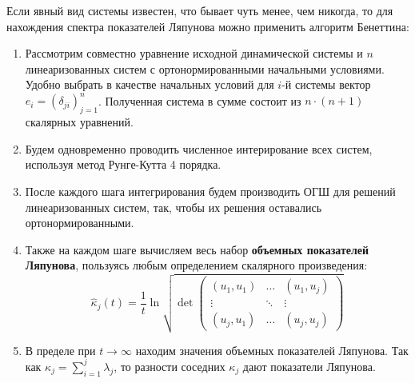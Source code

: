 Если явный вид системы известен, что бывает чуть менее, чем никогда, то для нахождения спектра показателей Ляпунова можно применить алгоритм Бенеттина:
\begin{enumerate}
\item
    Рассмотрим совместно уравнение исходной динамической системы и $n$ линеаризованных систем с ортонормированными начальными условиями.
    Удобно выбрать в качестве начальных условий для $i$-й системы вектор $e_i = \left( \delta_{ji} \right)_{j=1}^{n}$.
    Полученная система в сумме состоит из $n\cdot\left( n+1 \right)$ скалярных уравнений.
\item
    Будем одновременно проводить численное интерирование всех систем, используя метод Рунге-Кутта 4 порядка.
\item
    После каждого шага интегрирования будем производить ОГШ для решений линеаризованных систем, так, чтобы их решения оставались ортонормированными.
\item
    Также на каждом шаге вычисляем весь набор \textbf{объемных показателей Ляпунова}, пользуясь любым определением скалярного произведения:
    \begin{equation*}
        \hat{\kappa}_j(t) = \frac{1}{t} \ln \sqrt{\det \begin{pmatrix}
            \left( u_1, u_1 \right) & \dots & \left( u_1, u_j \right)\\
            \vdots & \ddots & \vdots\\
            \left( u_j, u_1 \right) & \dots & \left( u_j, u_j \right)
        \end{pmatrix} }
    \end{equation*}
\item
    В пределе при $t \to \infty$ находим значения объемных показателей Ляпунова. Так как $\kappa_j = \sum_{i=1}^{j} \lambda_j$, то разности соседних $\kappa_j$ дают показатели Ляпунова.
\end{enumerate}

